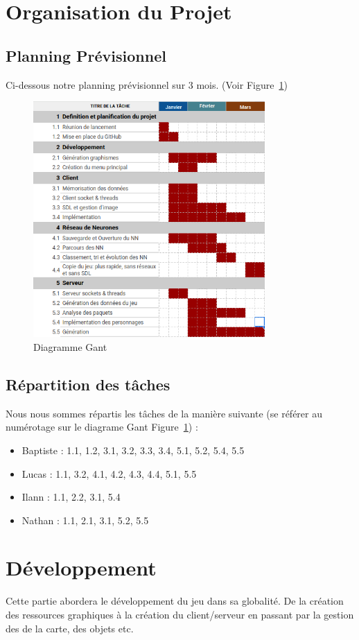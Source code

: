\documentclass[11pt]{article}
\begin{document}
    \section{Organisation du Projet}
        \subsection{Planning Prévisionnel}
        Ci-dessous notre planning prévisionnel sur 3 mois. (Voir Figure~\ref{fig:Gant})
        \begin{figure}[H]
            \begin{center}
                \includegraphics[height=9cm]{gant.png}
                \caption{Diagramme Gant}
                \label{fig:Gant} 
            \end{center}
        \end{figure}
        \subsection{Répartition des tâches}
        Nous nous sommes répartis les tâches de la manière suivante (se référer au numérotage sur le diagrame Gant Figure~\ref{fig:Gant}) :
        \begin{itemize}
            \item Baptiste : 1.1, 1.2, 3.1, 3.2, 3.3, 3.4, 5.1, 5.2, 5.4, 5.5
            \item Lucas : 1.1, 3.2, 4.1, 4.2, 4.3, 4.4, 5.1, 5.5
            \item Ilann : 1.1, 2.2, 3.1, 5.4
            \item Nathan : 1.1, 2.1, 3.1, 5.2, 5.5
        \end{itemize}
    \section{Développement}
    Cette partie abordera le développement du jeu dans sa globalité. De la création des ressources graphiques à la création du client/serveur en passant par la gestion des de la carte, des objets etc. 
\end{document}
